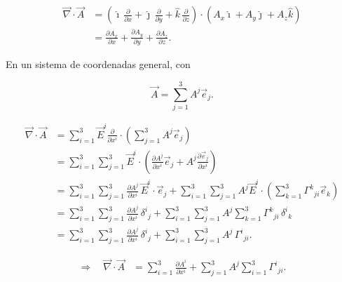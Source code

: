\documentclass[../apunte_mecanica_clasica.tex]{subfiles}%
\begin{document}
\begin{align*}
    \vec{\nabla}\cdot\vec{A} 
    &= \left( \hat{\imath}\,\frac{\partial}{\partial x} 
           + \hat{\jmath}\,\frac{\partial}{\partial y} 
           + \hat{k}\,\frac{\partial}{\partial z}\right)
       \cdot \left(A_x \hat{\imath} + A_y \hat{\jmath} + A_z \hat{k}\right) \\[6pt]
    &= \frac{\partial A_x}{\partial x} 
     + \frac{\partial A_y}{\partial y} 
     + \frac{\partial A_z}{\partial z}.
\end{align*}

En un sistema de coordenadas general, con

\begin{equation*}
    \vec{A} = \sum_{j=1}^3 A^j \vec{e}_j.
\end{equation*}

\begin{align*}  
    \vec{\nabla}\cdot\vec{A} 
    &= \sum_{i=1}^3 \vec{E}^i \frac{\partial}{\partial x^i} 
       \cdot \left( \sum_{j=1}^3 A^j \vec{e}_j \right) \\[6pt]
    &= \sum_{i=1}^3 \sum_{j=1}^3 
       \vec{E}^i \cdot \left( 
            \frac{\partial A^j}{\partial x^i} \vec{e}_j 
            + A^j \frac{\partial \vec{e}_j}{\partial x^i}
       \right) \\[6pt]
    &= \sum_{i=1}^3 \sum_{j=1}^3 
       \frac{\partial A^j}{\partial x^i} \, \vec{E}^i \cdot \vec{e}_j
       + \sum_{i=1}^3 \sum_{j=1}^3 A^j 
          \vec{E}^i \cdot \left( \sum_{k=1}^3 \Gamma^k{}_{ji} \vec{e}_k \right) \\[6pt]
    &= \sum_{i=1}^3 \sum_{j=1}^3 
       \frac{\partial A^j}{\partial x^i} \,\delta^i{}_j
       + \sum_{i=1}^3 \sum_{j=1}^3 A^j \sum_{k=1}^3 \Gamma^k{}_{ji}\,\delta^i{}_k \\[6pt]
    &= \sum_{i=1}^3 \sum_{j=1}^3 
       \frac{\partial A^j}{\partial x^i} \,\delta^i{}_j
       + \sum_{i=1}^3 \sum_{j=1}^3 A^j \,\Gamma^i{}_{ji}.
\end{align*}

\begin{align*}
    \Rightarrow \quad 
    \vec{\nabla}\cdot\vec{A}
    &= \sum_{i=1}^3 \frac{\partial A^i}{\partial x^i}
       + \sum_{j=1}^3 A^j \sum_{i=1}^3 \Gamma^i{}_{ji}.
\end{align*}
\end{document}
